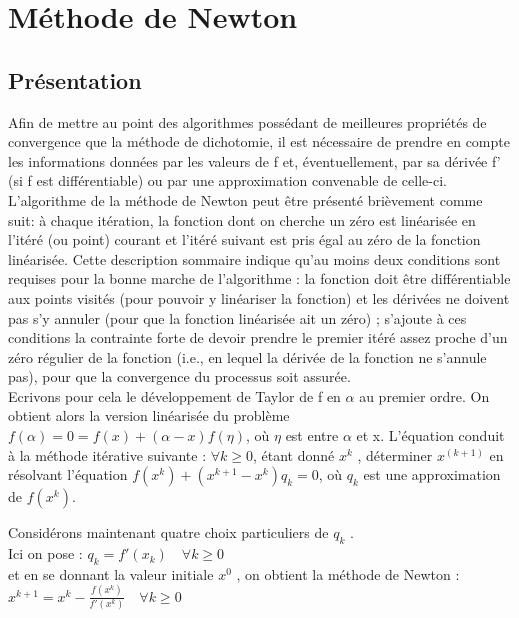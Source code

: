 \documentclass{article}
\begin{document}
\newpage




\section{Méthode de Newton}
\subsection{Présentation} 
\quad Afin de mettre au point des algorithmes possédant de meilleures propriétés de convergence que la méthode de dichotomie, il est nécessaire de prendre en
compte les informations données par les valeurs de f et, éventuellement, par sa dérivée f' (si f est différentiable) ou par une approximation convenable de celle-ci.\\
 L'algorithme de la méthode de Newton peut être présenté brièvement comme suit: à chaque itération, la fonction dont on cherche un zéro est linéarisée en l'itéré (ou point) courant et l'itéré suivant est pris égal au zéro de la fonction linéarisée. Cette description sommaire indique qu'au moins deux conditions sont requises pour la bonne marche de l'algorithme : la fonction doit être différentiable aux points visités (pour pouvoir y linéariser la fonction) et les dérivées ne doivent pas s'y annuler (pour que la fonction linéarisée ait un zéro) ; s'ajoute à ces conditions la contrainte forte de devoir prendre le premier itéré assez proche d'un zéro régulier de la fonction (i.e., en lequel la dérivée de la fonction ne s'annule pas), pour que la convergence du processus soit assurée. \\


Ecrivons pour cela le développement de Taylor de f en $\alpha$  au premier ordre.
On obtient alors la version linéarisée du problème
$f(\alpha) = 0 = f(x) + (\alpha−x)f(\eta)$,
où $\eta$ est entre $\alpha$ et x. L’équation  conduit à la méthode itérative suivante :
$\forall k \geq 0$, étant donné $x^k$ , déterminer $x^(k+1)$ en résolvant l’équation
$ f(x^k) + (x^{k+1}-x^k)q_k = 0$, où $q_k$ est une approximation de $f(x^k)$.

\quadd Considérons maintenant quatre choix particuliers de $q_k$ . \\
\quadd Ici on pose : \quad $q_k=f'(x_k)  \quad \forall k\geq 0$ \\ et en se donnant la valeur initiale $x^0$ , on obtient la méthode de Newton : \\
    \quadd $x^{k+1} = x^k - \frac{f(x^k)}{f'(x^k)} \quad \forall k\geq 0$ \\
\end{document}
